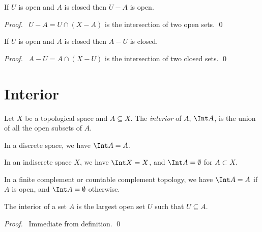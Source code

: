 \begin{proposition}
    If $U$ is open and $A$ is closed then $U - A$ is open.
\end{proposition}

\begin{proof}
    \pf\ $U - A = U \cap (X - A)$ is the intersection of two open sets. \qed
\end{proof}

\begin{proposition}
    If $U$ is open and $A$ is closed then $A - U$ is closed.
\end{proposition}

\begin{proof}
    \pf\ $A - U = A \cap (X - U)$ is the intersection of two closed sets. \qed
\end{proof}

\section{Interior}

\begin{definition}[Interior]
    Let $X$ be a topological space and $A \subseteq X$. The \emph{interior} of $A$, $\Int A$, is the union
    of all the open subsets of $A$.
\end{definition}

\begin{proposition}
    In a discrete space, we have $\Int A = A$.
\end{proposition}

\begin{proposition}
    In an indiscrete space $X$, we have $\Int X = X$, and $\Int A = \emptyset$ for $A \subset X$.
\end{proposition}

\begin{proposition}
    In a finite complement or countable complement topology, we have $\Int A = A$ if $A$ is open, and $\Int A = \emptyset$ otherwise.
\end{proposition}

\begin{proposition}
    \label{proposition:interior_open}
    The interior of a set $A$ is the largest open set $U$ such that $U \subseteq A$.
\end{proposition}

\begin{proof}
    \pf\ Immediate from definition. \qed
\end{proof}

